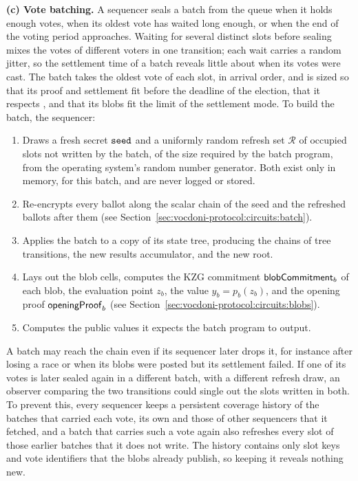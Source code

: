 \noi \textbf{(c) Vote batching.} A sequencer seals a batch from the queue when it holds enough votes, when its oldest vote has waited long enough, or when the end of the voting period approaches. Waiting for several distinct slots before sealing mixes the votes of different voters in one transition; each wait carries a random jitter, so the settlement time of a batch reveals little about when its votes were cast. The batch takes the oldest vote of each slot, in arrival order, and is sized so that its proof and settlement fit before the deadline of the election, that it respects \maxvoters, and that its blobs fit the limit of the settlement mode. To build the batch, the sequencer:
\begin{enumerate}
	\item Draws a fresh secret $\texttt{seed}$ and a uniformly random refresh set $\mathcal{R}$ of occupied slots not written by the batch, of the size required by the batch program, from the operating system's random number generator. Both exist only in memory, for this batch, and are never logged or stored.
	\item Re-encrypts every ballot along the scalar chain of the seed and the refreshed ballots after them (see Section~\ref{sec:vocdoni-protocol:circuits:batch}).
	\item Applies the batch to a copy of its state tree, producing the chains of tree transitions, the new results accumulator, and the new root.
	\item Lays out the blob cells, computes the \ac{KZG} commitment ${\sf{blobCommitment}}_b$ of each blob, the evaluation point $z_b$, the value $y_b = p_b(z_b)$, and the opening proof ${\sf{openingProof}}_b$ (see Section~\ref{sec:vocdoni-protocol:circuits:blobs}).
	\item Computes the public values it expects the batch program to output.
\end{enumerate}
A batch may reach the chain even if its sequencer later drops it, for instance after losing a race or when its blobs were posted but its settlement failed. If one of its votes is later sealed again in a different batch, with a different refresh draw, an observer comparing the two transitions could single out the slots written in both. To prevent this, every sequencer keeps a persistent coverage history of the batches that carried each vote, its own and those of other sequencers that it fetched, and a batch that carries such a vote again also refreshes every slot of those earlier batches that it does not write. The history contains only slot keys and vote identifiers that the blobs already publish, so keeping it reveals nothing new.\\

